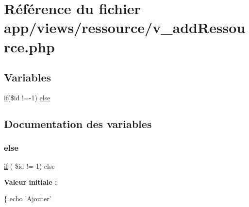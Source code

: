 \hypertarget{v__add_ressource_8php}{}\section{Référence du fichier app/views/ressource/v\+\_\+add\+Ressource.php}
\label{v__add_ressource_8php}
\subsection*{Variables}
\begin{DoxyCompactItemize}
\item 
\hyperlink{_v__menu_8php_ac81b1d41ce3949361fdb64fac6891d95}{if}(\$id !=-\/1) \hyperlink{v__add_ressource_8php_aa2a7181caf9a13ae97bce535bcd061d2}{else}
\end{DoxyCompactItemize}


\subsection{Documentation des variables}
\mbox{\label{v__add_ressource_8php_aa2a7181caf9a13ae97bce535bcd061d2}} 
\subsubsection{\texorpdfstring{else}{else}}
{\footnotesize\ttfamily \hyperlink{_v__menu_8php_ac81b1d41ce3949361fdb64fac6891d95}{if} ( \$id !=-\/1) else}

{\bfseries Valeur initiale \+:}
\begin{DoxyCode}
\{
    echo \textcolor{stringliteral}{'Ajouter'}
\end{DoxyCode}

